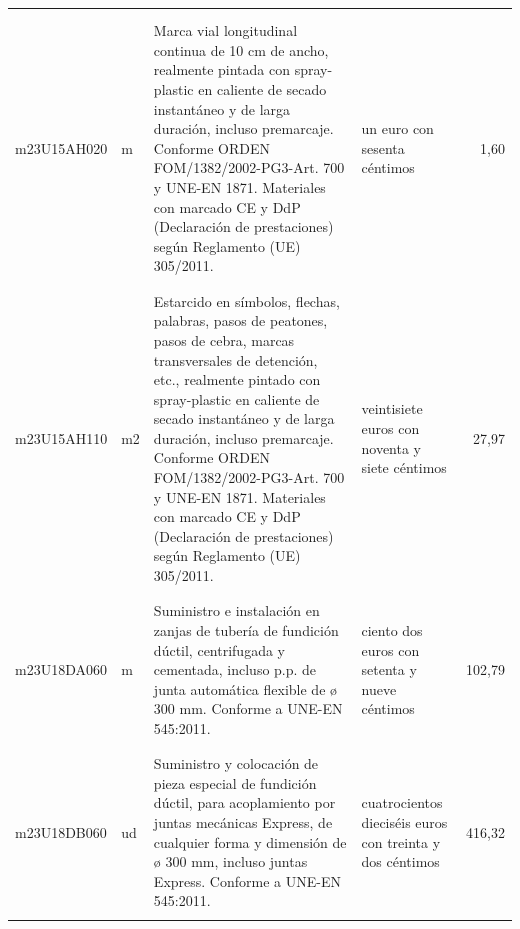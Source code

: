 \documentclass{book}%
\begin{document}
\begin{longtable}{|l|l|p{5cm}|p{3cm}|r|}
&&&&\\%
&&&&\\%
m23U15AH020&m&Marca vial longitudinal continua de 10 cm de ancho, realmente pintada con spray{-}plastic en caliente de secado instantáneo y de larga duración, incluso premarcaje. Conforme ORDEN FOM/1382/2002{-}PG3{-}Art. 700 y UNE{-}EN 1871. Materiales con marcado CE y DdP (Declaración de prestaciones) según Reglamento (UE) 305/2011.&un euro con sesenta céntimos&1,60\\%
&&&&\\%
&&&&\\%
m23U15AH110&m2&Estarcido en símbolos, flechas, palabras, pasos de peatones, pasos de cebra, marcas transversales de detención, etc., realmente pintado con spray{-}plastic en caliente de secado instantáneo y de larga duración, incluso premarcaje. Conforme ORDEN FOM/1382/2002{-}PG3{-}Art. 700 y UNE{-}EN 1871. Materiales con marcado CE y DdP (Declaración de prestaciones) según Reglamento (UE) 305/2011.&veintisiete euros con noventa y siete céntimos&27,97\\%
&&&&\\%
&&&&\\%
m23U18DA060&m&Suministro e instalación en zanjas de tubería de fundición dúctil, centrifugada y cementada, incluso p.p. de junta automática flexible de ø 300 mm. Conforme a UNE{-}EN 545:2011.&ciento dos euros con setenta y nueve céntimos&102,79\\%
&&&&\\%
&&&&\\%
m23U18DB060&ud&Suministro y colocación de pieza especial de fundición dúctil, para acoplamiento por juntas mecánicas Express, de cualquier forma y dimensión de ø 300 mm, incluso juntas Express. Conforme a UNE{-}EN 545:2011.&cuatrocientos dieciséis euros con treinta y dos céntimos&416,32\\%
&&&&\\%
\end{longtable}%
\normalsize%


%
\end{document}
